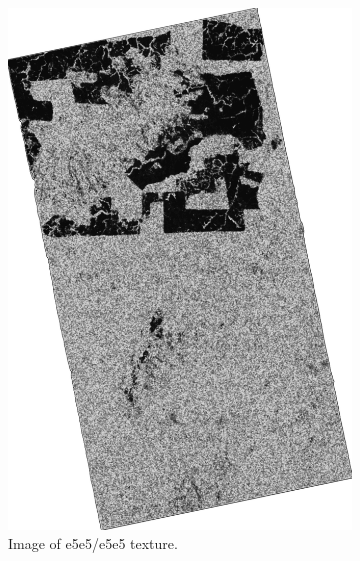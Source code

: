 \begin{figure}[H]
  \centering
  \begin{subfigure}[b]{0.4\linewidth}
    \includegraphics[width=\linewidth]{Chapter4/laws_textures/e5e5_e5e5image.png}
     \caption{Image of e5e5/e5e5 texture.}
  \end{subfigure}
  \centering
  \begin{subfigure}[b]{0.4\linewidth}

\end{subfigure}
\end{figure}
